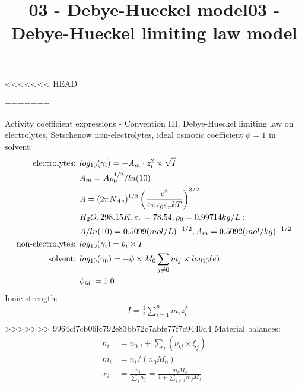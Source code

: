 \documentclass[onecolumn]{article}
\begin{document}
<<<<<<< HEAD
\title{03 - Debye-Hueckel model}
\author{}
\date{}
\maketitle
=======
\title{03 - Debye-Hueckel limiting law model}
\author{}
\date{}
\maketitle
Activity coefficient expressions - Convention III, Debye-Hueckel
limiting law on electrolytes,
Setschenow non-electrolytes, ideal osmotic coefficient $\phi=1$ in solvent:
\begin{equation}
\label{eq:activity_coeff}
\begin{aligned}
\textnormal{electrolytes: } & log_{10}(\gamma_{i}) =
-A_m \cdot z_i^2 \times \sqrt{I} \\
& A_m = A \rho_0^{1/2}/ln(10) \\
& A = (2 \pi N_{Av})^{1/2}
\left({e^2}\over{4 \pi \varepsilon_0 \varepsilon_r  k T} \right)^{3/2}\\
& H_2O, 298.15K, \varepsilon_r=78.54, \rho_0=0.99714kg/L: \\
& A/ln(10)=0.5099 (mol/L)^{-1/2}, A_m=0.5092 (mol/kg)^{-1/2} \\
\textnormal{non-electrolytes: } & log_{10}(\gamma_{i}) = b_i \times I \\
\textnormal{solvent: } & log_{10}(\gamma_{0}) =
-\phi \times M_0 \sum_{j\neq0}{m_j} \times log_{10}(e)\\
 & \phi_{id.} =   1.0 \\
\end{aligned}
\end{equation}
Ionic strength:
\begin{equation}
\label{eq:ionic_strength}
\begin{aligned}
& I = \frac{1}{2} \sum_{i=1}^n m_i z_i^2 \\
\end{aligned}
\end{equation}
>>>>>>> 9964cf7cb06fc792e83bb72c7abfe77f7c9440d4
Material balances:
\begin{equation}
\begin{aligned}
\label{eq:mole_balance}
n_i &= n_{0,i} + \sum_j(\nu_{ij} \times \xi_j) \\
m_i &= n_i /(n_0 M_0) \\
x_i &= \frac{n_i}{\sum_j{n_j}}= \frac{m_i M_0}{1+\sum_{j\neq0}{m_j M_0}}
\end{aligned}
\end{equation}
\end{document}
